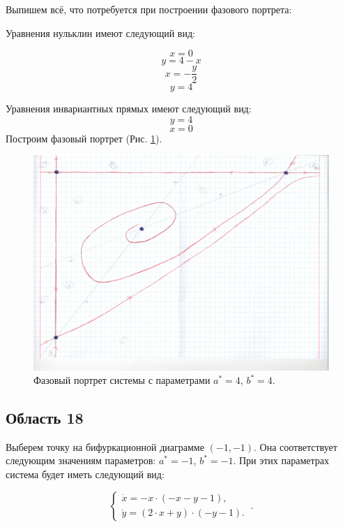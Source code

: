 Выпишем всё, что потребуется при построении фазового портрета:

Уравнения нульклин имеют следующий вид: 

$$x=0$$
$$y=4 - x$$
$$x=- \frac{y}{2}$$
$$y=4$$


Уравнения инвариантных прямых имеют следующий вид: 
$$y = 4$$
$$x = 0$$
Построим фазовый портрет (Рис. \ref{fig:phportr17}).

\begin{figure}[h]
	
	\includegraphics[width=\textwidth]{phptr/(4, 1).jpeg}
	\centering
	\caption{\label{fig:phportr17} Фазовый портрет системы с параметрами $a^\ast = 4$, $b^\ast = 4$.}
	
\end{figure}

\subsection{Область 18}

Выберем точку на бифуркационной диаграмме $(-1, -1)$. Она соответствует следующим значениям параметров:  $a^\ast = -1$, $b^\ast = -1$. При этих параметрах система будет иметь следующий вид: 

$$
\left \lbrace 
\begin{matrix} 
	\dot{x} = -x \cdot (-x - y - 1), \\
	\dot{y} = (2 \cdot x + y) \cdot (-y - 1). \
\end{matrix} 
\right . .$$

